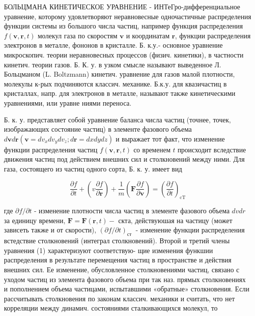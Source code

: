 \documentclass[10pt]{article}
\begin{document}
БОЛЬЦМАНА КИНЕТИЧЕСКОЕ УРАВНЕНИЕ - ИНТеГро-дифференциальное уравнение, которому удовлетворяют неравновесные одночастичные распределения функции системы из большого числа частиц, например функция распределения $f(\boldsymbol{v}, \boldsymbol{r}, t)$ молекул газа по скоростям $\boldsymbol{v}$ и координатам $\boldsymbol{r}$, функции распределения электронов в металле, фононов в кристалле. Б. к.у.- основное уравнение микроскопич. теории неравновесных процессов (физич. кинетики), в частности кинетич. теории газов. Б. К. у. в узком смысле называют выведенное Л. Больцманом (L. Boltzmann) кинетич. уравнение для газов малой плотности, молекулы к-рых подчиняются классич. механике. Б.к.у. для квазичастиц в кристаллах, напр. для электронов в металле, называют также кинетическими уравнениями, или уравне ниями переноса.



Б. к. у. представляет собой уравнение баланса числа частиц (точнее, точек, изображающих состояние частиц) в элементе фазового объема $d \boldsymbol{v} d \boldsymbol{r}\left(\boldsymbol{v}=d v_{x} d v_{y} d v_{z} ; d \boldsymbol{r}=d x d y d z\right)$ и выражает тот факт, что изменение функции распределения частиц $f(\boldsymbol{v}, \boldsymbol{r}, t)$ со временем $t$ происходит вследствие движения частиц под действием внешних сил и столкновений между ними. Для газа, состоящего из частиц одного сорта, Б. к. у. имеет вид



\[

\frac{\partial f}{\partial t}+\left(v \frac{\partial f}{\partial \boldsymbol{r}}\right)+\frac{1}{m}\left(\boldsymbol{F} \frac{\partial f}{\partial \boldsymbol{v}}\right)=\left(\frac{\partial f}{\partial t}\right)_{\mathrm{cT}}

\]



где $\partial f / \partial t$ - изменение плотности числа частиц в элементе фазового объема $d v d r$ за единицу времени, $\boldsymbol{F}=\boldsymbol{F}(\boldsymbol{r}, t)-$ скта, действуюшая на частицу (может зависеть также и от скорости), $(\partial f / \partial t)_{\text {ст }}$ - изменение функции распределения встедствие столкновений (интеграл столкновений). Второй и третий члены уравнения (1) характеризуют соответствую- щие изменения функшии распределения в результате перемещения частиц в пространстве и действия внешних сил. Ее изменение, обусловленное столкновениями частиц, связано с уходом частиц из элемента фазового объема при так наз. прямых столкновениях и пополнением объема частицами, испытавшими «обратные» столкновения. Если рассчитывать столкновения по законам классич. механики и считать, что нет корреляции между динамич. состояниями сталкивающихся молекул, то
\end{document}
